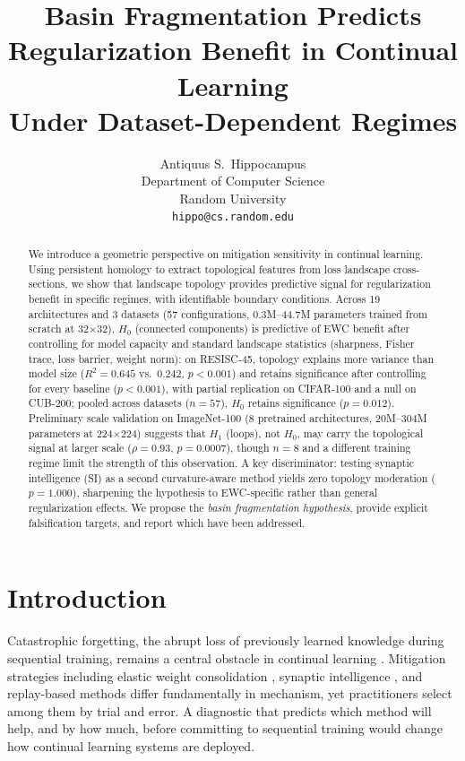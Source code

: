 \documentclass{article}
\title{Basin Fragmentation Predicts Regularization Benefit in Continual Learning\\Under Dataset-Dependent Regimes}
\author{Antiquus S.~Hippocampus \\
Department of Computer Science\\
Random University\\
\texttt{hippo@cs.random.edu}}
\begin{document}
\maketitle

\begin{abstract}
We introduce a geometric perspective on mitigation sensitivity in continual learning. Using persistent homology to extract topological features from loss landscape cross-sections, we show that landscape topology provides predictive signal for regularization benefit in specific regimes, with identifiable boundary conditions. Across 19 architectures and 3 datasets (57 configurations, 0.3M--44.7M parameters trained from scratch at 32$\times$32), $H_0$ (connected components) is predictive of EWC benefit after controlling for model capacity and standard landscape statistics (sharpness, Fisher trace, loss barrier, weight norm): on RESISC-45, topology explains more variance than model size ($R^2 = 0.645$ vs.\ $0.242$, $p < 0.001$) and retains significance after controlling for every baseline ($p < 0.001$), with partial replication on CIFAR-100 and a null on CUB-200; pooled across datasets ($n = 57$), $H_0$ retains significance ($p = 0.012$). Preliminary scale validation on ImageNet-100 (8 pretrained architectures, 20M--304M parameters at 224$\times$224) suggests that $H_1$ (loops), not $H_0$, may carry the topological signal at larger scale ($\rho = 0.93$, $p = 0.0007$), though $n = 8$ and a different training regime limit the strength of this observation. A key discriminator: testing synaptic intelligence (SI) as a second curvature-aware method yields zero topology moderation ($p = 1.000$), sharpening the hypothesis to EWC-specific rather than general regularization effects. We propose the \emph{basin fragmentation hypothesis}, provide explicit falsification targets, and report which have been addressed.
\end{abstract}

\section{Introduction}
\label{sec:intro}

Catastrophic forgetting, the abrupt loss of previously learned knowledge during sequential training, remains a central obstacle in continual learning \citep{mccloskey1989catastrophic, french1999catastrophic}. Mitigation strategies including elastic weight consolidation \citep[EWC;][]{kirkpatrick2017overcoming}, synaptic intelligence \citep{zenke2017continual}, and replay-based methods \citep{rebuffi2017icarl} differ fundamentally in mechanism, yet practitioners select among them by trial and error. A diagnostic that predicts which method will help, and by how much, before committing to sequential training would change how continual learning systems are deployed.
\end{document}
